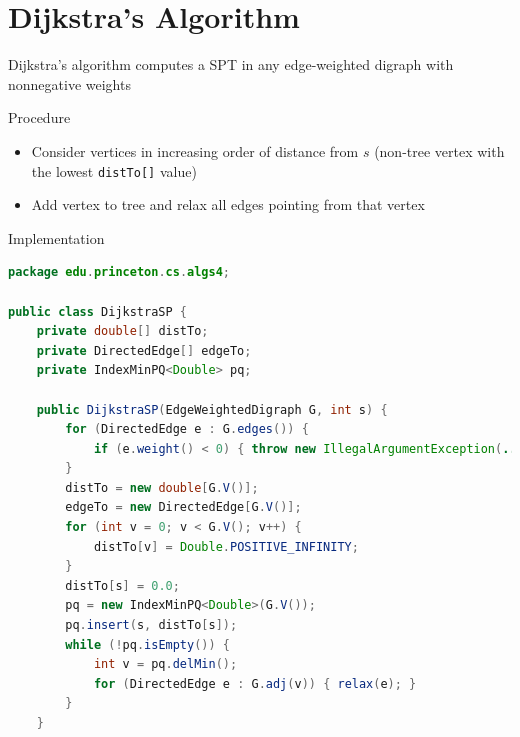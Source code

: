 \documentclass[8pt,a4paper,compress]{beamer}
\begin{document}
\section{Dijkstra's Algorithm}
\begin{frame}[fragile]
Dijkstra's algorithm computes a SPT in any edge-weighted
digraph with nonnegative weights

\bigskip

Procedure
\begin{itemize}
\item Consider vertices in increasing order of distance from $s$ (non-tree vertex with the lowest \lstinline{distTo[]} value)
\item Add vertex to tree and relax all edges pointing from that vertex
\end{itemize}

\bigskip

Implementation
\begin{lstlisting}[language=Java]
package edu.princeton.cs.algs4;

public class DijkstraSP {
    private double[] distTo; 
    private DirectedEdge[] edgeTo; 
    private IndexMinPQ<Double> pq; 
    
    public DijkstraSP(EdgeWeightedDigraph G, int s) {
        for (DirectedEdge e : G.edges()) {
            if (e.weight() < 0) { throw new IllegalArgumentException(...); }
        }
        distTo = new double[G.V()];
        edgeTo = new DirectedEdge[G.V()];
        for (int v = 0; v < G.V(); v++) { 
            distTo[v] = Double.POSITIVE_INFINITY; 
        }
        distTo[s] = 0.0;
        pq = new IndexMinPQ<Double>(G.V());
        pq.insert(s, distTo[s]);
        while (!pq.isEmpty()) {
            int v = pq.delMin();
            for (DirectedEdge e : G.adj(v)) { relax(e); }
        }
    }    
\end{lstlisting}
\end{frame}
\end{document}
